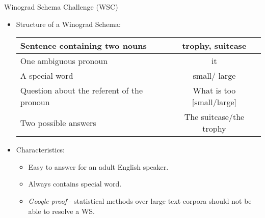 \documentclass[svgnames, final, 20pt]{beamer} %
\begin{document}
\begin{frame}[fragile]
\begin{columns}[t]
\vspace{-1.8cm}
\begin{block}{Winograd Schema Challenge (WSC)}
	\justify
	\begin{itemize}
		\item Structure of a Winograd Schema:
		\begin{center}
			\begin{tabular}{ l | c }
				Sentence containing {\color{myorange}two nouns} &  {\color{myorange}trophy}, {\color{myorange}suitcase} \\
				\hline 
				{\color{myorange}One} ambiguous {\color{myorange}pronoun} & {\color{myorange}it} \\  
				\hline
				A {\color{myorange}special word} & {\color{myorange}small}/{\color{myorange} large}\\
				\hline
				{\color{myorange}Question} about the referent of the pronoun & What is too [{\color{myorange}small}/{\color{myorange}large}]\\
				\hline
				{\color{myorange}Two} possible {\color{myorange}answers} & {\color{myorange}The suitcase}/{\color{myorange}the trophy}
			\end{tabular}
		\end{center}
		\item Characteristics:
		\begin{itemize}
			\item Easy to answer for an adult English speaker.
			\item Always contains {\color{myorange}special word}.
			\item \textit{Google-proof} - statistical methods over large text corpora should not be able to resolve a WS.
		\end{itemize}
	\end{itemize}
	

\end{block}
\end{columns}
\end{frame}
\end{document}
